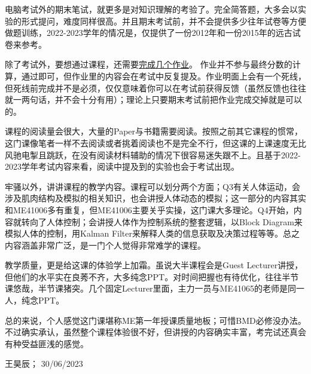 电脑考试外的期末笔试，就更多是对知识理解的考验了。完全简答题，大多会以实验的形式提问，难度同样很高。并且期末考试前，并不会提供多少往年试卷等方便做题训练，2022-2023学年的情况是，仅提供了一份2012年和一份2015年的远古试卷来参考。

除了考试外，要想通过课程，还需要\href{https://drive.google.com/file/d/1KxbD13PnAkygeto3pSj9S3xFacHufyzy/view?usp=sharing}{\uline{完成几个作业}}。 作业并不参与最终分数的计算，通过即可，但作业里的内容会在考试中反复提及。作业明面上会有一个死线，但死线前完成并不是必须，仅仅意味着你可以在考试前获得反馈（虽然反馈也往往就一两句话，并不会十分有用）；理论上只要期末考试前把作业完成交掉就是可以的。

课程的阅读量会很大，大量的Paper与书籍需要阅读。按照之前其它课程的惯常，这门课像笔者一样不去阅读或者挑着阅读也不是完全不行，但这课的上课速度无比风驰电掣且跳跃，在没有阅读材料辅助的情况下很容易迷失跟不上。且基于2022-2023学年考试内容来看，阅读中提及到的实验也会于考试出现。

牢骚以外，讲讲课程的教学内容。课程可以划分两个方面；Q3有关人体运动，会涉及肌肉结构及模拟的相关知识，也会讲授人体动态的模拟；这一部分的内容其实和ME41006多有重复，但ME41006主要关乎实操，这门课大多理论。Q4开始，内容就转向了人体控制；会讲授人体作为控制系统的整套逻辑，以Block Diagram来模拟人体的控制，用Kalman Filter来解释人类的信息获取及决策过程等等。总之内容涵盖非常广泛，是一门个人觉得非常难学的课程。

教学质量，更是给这课的体验学上加霜。虽说大半课程会是Guest Lecturer讲授，但他们的水平实在良莠不齐，大多纯念PPT。对时间把握也有待优化，往往半节课悠哉，半节课猪突。几个固定Lecturer里面，主力一员与ME41065的老师是同一人，纯念PPT。

总的来说，个人感觉这门课堪称ME第一年授课质量地板；可惜BMD必修没办法。不过确实承认，虽然整个课程体验很不好，但讲授的内容确实丰富，考完试还真会有种受益匪浅的感觉。
\begin{flushright}
王昊辰； 30/06/2023
\end{flushright}

